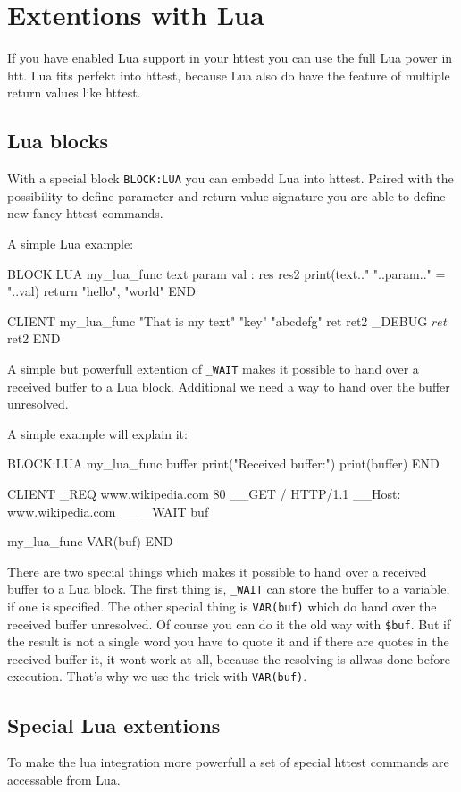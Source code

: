 \section{Extentions with Lua}
If you have enabled Lua support in your httest you can use the full Lua
power in htt. Lua fits perfekt into httest, because Lua also do have the feature
of multiple return values like httest. 

\subsection{Lua blocks}
With a special block \texttt{BLOCK:LUA} you can embedd Lua into httest. Paired
with the possibility to define parameter and return value signature you are
able to define new fancy httest commands.

A simple Lua example:

\begin{usplisting}
    BLOCK:LUA my_lua_func text param val : res res2
      print(text.." "..param.." = "..val)
      return "hello", "world"
    END
      
    CLIENT
      my_lua_func "That is my text" "key" "abcdefg" ret ret2
      _DEBUG $ret $ret2
    END
\end{usplisting}

A simple but powerfull extention of \texttt{\_WAIT} makes it possible to hand over a
received buffer to a Lua block. Additional we need a way to hand over the buffer
unresolved. 

A simple example will explain it:

\begin{usplisting}
    BLOCK:LUA my_lua_func buffer
      print("Received buffer:")
      print(buffer)
    END
      
    CLIENT
      _REQ www.wikipedia.com 80
      __GET / HTTP/1.1
      __Host: www.wikipedia.com
      __
      _WAIT buf
      
      my_lua_func VAR(buf)
    END
\end{usplisting}

There are two special things which makes it possible to hand over a received 
buffer to a Lua block. The first thing is, \texttt{\_WAIT} can store the buffer to a
variable, if one is specified. The other special thing is \texttt{VAR(buf)}
which do hand over the received buffer unresolved. Of course you can do it
the old way with \texttt{\$buf}. But if the result is not a single word you have
to quote it and if there are quotes in the received buffer it, it wont work at all,
because the resolving is allwas done before execution. That's why we use
the trick with \texttt{VAR(buf)}. 

\subsection{Special Lua extentions}
To make the lua integration more powerfull a set of special httest commands are
accessable from Lua.

